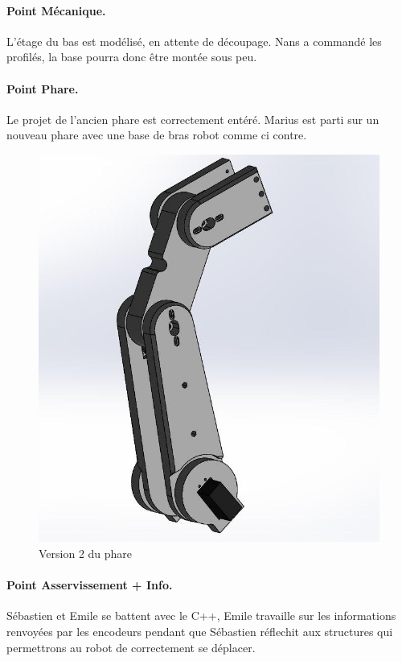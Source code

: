 \documentclass[a4paper,10pt]{report}
\theoremstyle{definition}
\begin{document}
\begin{spacing}{1.5}
\paragraph*{Point Mécanique.}
L'étage du bas est modélisé, en attente de découpage. Nans a commandé les
profilés, la base pourra donc être montée sous peu.

\paragraph*{Point Phare.}
Le projet de l'ancien phare est correctement entéré. Marius est parti sur un
nouveau phare avec une base de bras robot comme ci contre.
\begin{figure}[H]
  \center
  \includegraphics[scale=0.3]{phare.jpg}
  \caption{Version 2 du phare}
\end{figure}

\paragraph*{Point Asservissement + Info.}
Sébastien et Emile se battent avec le C++, Emile travaille sur les informations
renvoyées par les encodeurs pendant que Sébastien réflechit aux structures
qui permettrons au robot de correctement se déplacer.


\end{spacing}
\end{document}
